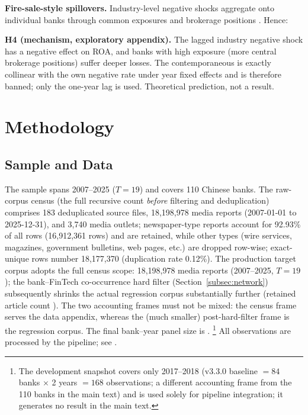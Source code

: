 \textbf{Fire-sale-style spillovers.} Industry-level negative shocks
aggregate onto individual banks through common exposures and
brokerage positions \parencite{duarte2021firesale,han2024brokerage}.
Hence:

\textbf{H4 (mechanism, exploratory appendix).} The lagged industry
negative shock  has a negative
effect on ROA, and banks with high 
exposure (more central brokerage positions) suffer deeper losses.
The contemporaneous  is exactly collinear
with the own negative rate under year fixed effects and is therefore
banned; only the one-year lag is used. Theoretical prediction, not a
result.

\section{Methodology}\label{sec:method}
\subsection{Sample and Data}
The sample spans 2007--2025 ($T=19$) and covers 110 Chinese banks.
The raw-corpus census (the full recursive count \emph{before}
filtering and deduplication) comprises 183 deduplicated source
files, 18{,}198{,}978 media reports (2007-01-01 to 2025-12-31), and
3{,}740 media outlets; newspaper-type reports account for 92.93\%
of all rows (16{,}912{,}361 rows) and are retained, while other
types (wire services, magazines, government bulletins, web pages,
etc.) are dropped row-wise; exact-unique rows number 18{,}177{,}370
(duplication rate 0.12\%). The production target corpus adopts
the full census scope: 18{,}198{,}978 media reports (2007--2025,
$T=19$); the bank--FinTech
co-occurrence hard filter (Section~\ref{subsec:network})
subsequently shrinks the actual regression corpus substantially
further (retained article count ). The two accounting frames must not
be mixed: the census frame serves the data appendix, whereas the
(much smaller) post-hard-filter frame is the regression corpus. The final bank--year
panel size is .%
\footnote{The development snapshot covers only 2017--2018 (v3.3.0
baseline $=84$ banks $\times$ 2 years $=168$ observations; a
different accounting frame from the 110 banks in the main text) and
is used solely for pipeline integration; it generates no result in
the main text.}
All observations are processed by the  pipeline;
see .

